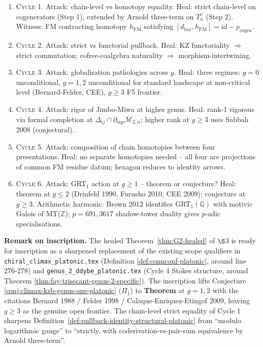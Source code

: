 \documentclass[12pt]{article}
\providecommand{\Mbar}{\overline{\mathcal{M}}}
\providecommand{\dbar}{d_{\mathrm{bar}}}
\theoremstyle{definition}
\begin{document}
\begin{enumerate}
\item \textsc{Cycle 1.}
Attack: chain-level vs homotopy equality.
Heal: strict chain-level on cogenerators (Step 1),
extended by Arnold three-term on $T^c_n$ (Step 2).
Witness: FM contracting homotopy $h_{\mathrm{FM}}$
satisfying $[\dbar, h_{\mathrm{FM}}] = \mathrm{id} - p_{\mathrm{cogen}}$.
\item \textsc{Cycle 2.}
Attack: strict vs functorial pullback.
Heal: KZ functoriality $\Rightarrow$ strict commutation;
cofree-coalgebra naturality $\Rightarrow$ morphism-intertwining.
\item \textsc{Cycle 3.}
Attack: globalisation pathologies across $g$.
Heal: three regimes: $g = 0$ unconditional,
$g = 1, 2$ unconditional for standard landscape at non-critical
level (Bernard-Felder, CEE), $g \geq 3$ F5 frontier.
\item \textsc{Cycle 4.}
Attack: rigor of Jimbo-Miwa at higher genus.
Heal: rank-1 rigorous via formal completion at
$\Delta_{ij} \cap \partial_{\mathrm{sep}}\Mbar_{2,n}$; higher
rank at $g \geq 3$ uses Sabbah 2008 (conjectural).
\item \textsc{Cycle 5.}
Attack: composition of chain homotopies between four presentations.
Heal: no separate homotopies needed -- all four are
projections of common FM residue datum; hexagon reduces to
identity arrows.
\item \textsc{Cycle 6.}
Attack: GRT$_1$ action at $g \geq 1$ -- theorem or conjecture?
Heal: theorem at $g \leq 2$ (Drinfeld 1990, Furusho 2010,
CEE 2009); conjecture at $g \geq 3$.
Arithmetic harmonic: Brown 2012 identifies GRT$_1(\mathbb{Q})$
with motivic Galois of MT($\mathbb{Z}$); $p = 691, 3617$
shadow-tower duality gives $p$-adic specialisations.
\end{enumerate}

\bigskip

\textbf{Remark on inscription.}
The healed Theorem~\ref{thm:G2-healed} of $\S$3 is ready for
inscription as a sharpened replacement of the existing scope
qualifiers in \texttt{chiral\_climax\_platonic.tex}
(Definition \ref{def:connconf-platonic}, around line 276-278)
and \texttt{genus\_2\_ddybe\_platonic.tex} (Cycle 4 Stokes
structure, around Theorem \ref{thm:fay-trisecant-genus-2-specific}).
The inscription lifts Conjecture
\ref{conj:climax-kzb-genus-one-platonic} ($\Pi_1$) to
\textbf{Theorem} at $g = 1, 2$ with the citations
Bernard 1988 / Felder 1998 / Calaque-Enriquez-Etingof 2009,
leaving $g \geq 3$ as the genuine open frontier.
The chain-level strict equality of Cycle 1 sharpens
Definition~\ref{def:pullback-identity-structural-platonic}
from ``modulo logarithmic gauge'' to ``strictly, with
coderivation-vs-pair-sum equivalence by Arnold three-term''.
\end{document}
